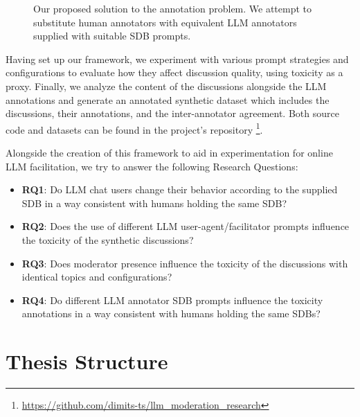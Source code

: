 \begin{figure}
	\centering
	
	\caption{Our proposed solution to the annotation problem. We attempt to substitute human annotators with equivalent LLM annotators supplied with suitable \ac{SDB} prompts.}
	\label{fig::goals_4}
\end{figure}


Having set up our framework, we experiment with various prompt strategies and configurations to evaluate how they affect discussion quality, using toxicity as a proxy. Finally, we analyze the content of the discussions alongside the LLM annotations and generate an annotated synthetic dataset which includes the discussions, their annotations, and the inter-annotator agreement. Both source code and datasets can be found in the project's repository \footnote{\url{https://github.com/dimits-ts/llm_moderation_research}}.

Alongside the creation of this framework to aid in experimentation for online LLM facilitation, we try to answer the following Research Questions:

\begin{itemize}
	\item \textbf{RQ1}: Do LLM chat users change their behavior according to the supplied \ac{SDB} in a way consistent with humans holding the same \ac{SDB}?
	
	\item \textbf{RQ2}: Does the use of different LLM user-agent/facilitator prompts influence the toxicity of the synthetic discussions?
	
	\item \textbf{RQ3}: Does moderator presence influence the toxicity of the discussions with identical topics and configurations?
	
	\item \textbf{RQ4}: Do different LLM annotator \ac{SDB} prompts influence the toxicity annotations in a way consistent with humans holding the same \acp{SDB}?
\end{itemize}



\section{Thesis Structure}
\label{sec:intro:structure}

